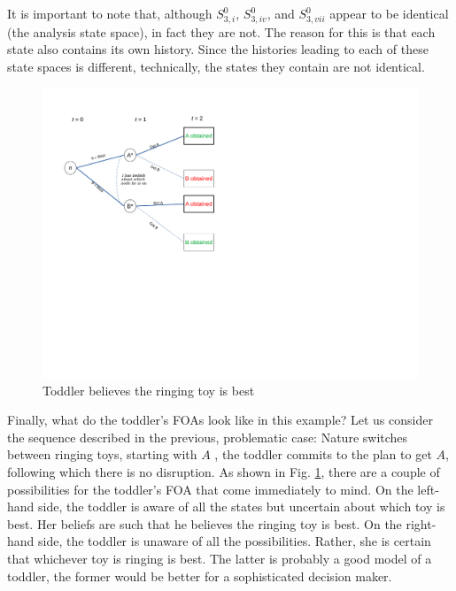 \documentclass[
11pt,
titlepage,
reqno,
]{article}%
\theoremstyle{definition}
\begin{document}
It is important to note that, although $S^0_{3,i}$, $S^0_{3,iv}$, and $S^0_{3,vii}$ appear to be identical (the analysis state space), in fact they are not. The reason for this is that each state also contains its own history. Since the histories leading to each of these state spaces is different, technically, the states they contain are not identical.



\begin{figure}[h!]
	\centering
	\includegraphics*[page=18,trim = 0in 5in 1.5in 0in,scale=.7]{Awareness_Diagrams_All}
	\caption{Toddler believes the ringing toy is best\label{Diag: p-18}}%
\end{figure}

Finally, what do the toddler's FOAs look like in this example? Let us consider the sequence described in the previous, problematic case: Nature switches between ringing toys, starting with $A$ , the toddler commits to the plan to get $A$, following which there is no disruption. As shown in Fig. \ref{Diag: p-18}, there are a couple of possibilities for the toddler's FOA that come immediately to mind. On the left-hand side, the toddler is aware of all the states but uncertain about which toy is best. Her beliefs are such that he believes the ringing toy is best. On the right-hand side, the toddler is unaware of all the possibilities. Rather, she is certain that whichever toy is ringing is best. The latter is probably a good model of a toddler, the former would be better for a sophisticated decision maker.
\end{document}
